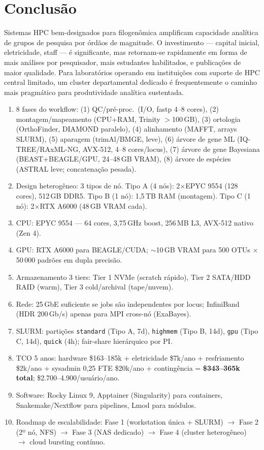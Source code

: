 \section{Conclusão}

Sistemas HPC bem-designados para filogenômica amplificam capacidade analítica de grupos de pesquisa por órdãos de magnitude. O investimento --- capital inicial, eletricidade, staff --- é significante, mas retornam-se rapidamente em forma de mais análises por pesquisador, mais estudantes habilitados, e publicações de maior qualidade. Para laboratórios operando em instituições com suporte de HPC central limitado, um cluster departamental dedicado é frequentemente o caminho mais pragmático para produtividade analítica sustentada.

\clearpage
\begin{revise}\small
\begin{enumerate}[itemsep=0pt, topsep=0pt, parsep=0pt]
    \item 8 fases do workflow: (1) QC/pré-proc.\ (I/O, fastp 4--8 cores), (2) montagem/mapeamento (CPU+RAM, Trinity $>$100\,GB), (3) ortologia (OrthoFinder, DIAMOND paralelo), (4) alinhamento (MAFFT, arrays SLURM), (5) aparagem (trimAl/BMGE, leve), (6) árvore de gene ML (IQ-TREE/RAxML-NG, AVX-512, 4--8 cores/locus), (7) árvore de gene Bayesiana (BEAST+BEAGLE/GPU, 24--48\,GB VRAM), (8) árvore de espécies (ASTRAL leve; concatenação pesada).
    \item Design heterogêneo: 3 tipos de nó. Tipo A (4 nós): 2$\times$EPYC 9554 (128 cores), 512\,GB DDR5. Tipo B (1 nó): 1,5\,TB RAM (montagem). Tipo C (1 nó): 2$\times$RTX A6000 (48\,GB VRAM cada).
    \item CPU: EPYC 9554 --- 64 cores, 3,75\,GHz boost, 256\,MB L3, AVX-512 nativo (Zen 4).
    \item GPU: RTX A6000 para BEAGLE/CUDA; $\sim$10\,GB VRAM para 500 OTUs $\times$ 50\,000 padrões em dupla precisão.
    \item Armazenamento 3 tiers: Tier 1 NVMe (scratch rápido), Tier 2 SATA/HDD RAID (warm), Tier 3 cold/archival (tape/nuvem).
    \item Rede: 25\,GbE suficiente se jobs são independentes por locus; InfiniBand (HDR 200\,Gb/s) apenas para MPI cross-nó (ExaBayes).
    \item SLURM: partições \texttt{standard} (Tipo A, 7d), \texttt{highmem} (Tipo B, 14d), \texttt{gpu} (Tipo C, 14d), \texttt{quick} (4h); fair-share hierárquico por PI.
    \item TCO 5 anos: hardware \$163--185k + eletricidade \$7k/ano + resfriamento \$2k/ano + sysadmin 0,25 FTE \$20k/ano + contingência = \textbf{\$343--365k total}; \$2.700--4.900/usuário/ano.
    \item Software: Rocky Linux 9, Apptainer (Singularity) para containers, Snakemake/Nextflow para pipelines, Lmod para módulos.
    \item Roadmap de escalabilidade: Fase 1 (workstation única + SLURM) $\to$ Fase 2 (2º nó, NFS) $\to$ Fase 3 (NAS dedicado) $\to$ Fase 4 (cluster heterogêneo) $\to$ cloud bursting contínuo.
\end{enumerate}
\end{revise}

\clearpage

\printbibliography[heading=subbibliography,title={Referências}]

